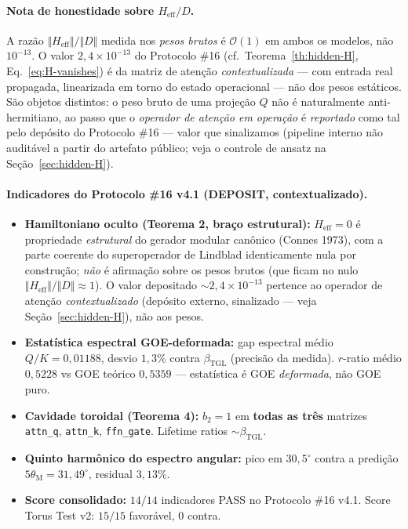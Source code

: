 \documentclass[12pt,a4paper]{article}
\newcommand{\betatgl}{\beta_{\text{TGL}}}
\newcommand{\thetaM}{\theta_{\text{M}}}
\begin{document}
\paragraph{Nota de honestidade sobre $H_{\text{eff}}/D$.}
A razão $\Vert H_{\text{eff}}\Vert/\Vert D\Vert$ medida nos \emph{pesos brutos}
é $\mathcal{O}(1)$ em ambos os modelos, não $10^{-13}$.
O valor $2{,}4\times10^{-13}$ do Protocolo \#16 (cf.\ Teorema~\ref{th:hidden-H},
Eq.~\ref{eq:H-vanishes}) é da matriz de atenção \emph{contextualizada} --- com entrada real propagada,
linearizada em torno do estado operacional --- não dos pesos estáticos.  São
objetos distintos: o peso bruto de uma projeção $Q$ não é naturalmente
anti-hermitiano, ao passo que o \emph{operador de atenção em operação} é
\emph{reportado} como tal pelo depósito do Protocolo \#16 --- valor que
sinalizamos (pipeline interno não auditável a partir do artefato público;
veja o controle de ansatz na Seção~\ref{sec:hidden-H}).


\paragraph{Indicadores do Protocolo \#16 v4.1 (DEPOSIT, contextualizado).}
\begin{itemize}[leftmargin=*]
\item \textbf{Hamiltoniano oculto (Teorema 2, braço estrutural):}
$H_{\text{eff}}=0$ é propriedade \emph{estrutural} do gerador modular
canônico (Connes 1973), com a parte coerente do superoperador de Lindblad
identicamente nula por construção; \emph{não} é afirmação sobre os pesos
brutos (que ficam no nulo $\Vert H_{\text{eff}}\Vert/\Vert D\Vert\approx 1$).
O valor depositado $\sim 2{,}4\times10^{-13}$ pertence ao operador de atenção
\emph{contextualizado} (depósito externo, sinalizado --- veja
Seção~\ref{sec:hidden-H}), não aos pesos.

\item \textbf{Estatística espectral GOE-deformada:}
gap espectral médio $Q/K = 0{,}01188$, desvio
$1{,}3\%$ contra $\betatgl$ (precisão da medida).
$r$-ratio médio $0{,}5228$ vs GOE teórico $0{,}5359$ ---
estatística é GOE \emph{deformada}, não GOE puro.

\item \textbf{Cavidade toroidal (Teorema 4):} $b_{2} = 1$ em
\textbf{todas as três} matrizes \texttt{attn\_q}, \texttt{attn\_k},
\texttt{ffn\_gate}.  Lifetime ratios $\sim \betatgl$.

\item \textbf{Quinto harmônico do espectro angular:} pico em $30{,}5^{\circ}$
contra a predição $5\thetaM = 31{,}49^{\circ}$, residual $3{,}13$\%.

\item \textbf{Score consolidado:} $14/14$ indicadores PASS no Protocolo
\#16 v4.1.  Score Torus Test v2: $15/15$ favorável, $0$ contra.
\end{itemize}
\end{document}
